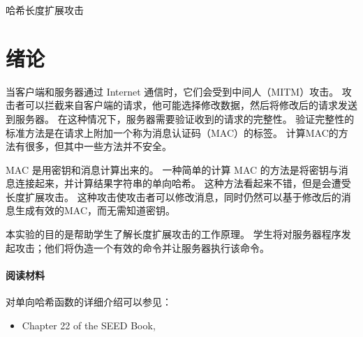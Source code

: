 
\newcommand{\commonfolder}{../../common-files}










\begin{center}
   {\LARGE 哈希长度扩展攻击}
\end{center}



\section{绪论}

当客户端和服务器通过 Internet 通信时，它们会受到中间人（MITM）攻击。
攻击者可以拦截来自客户端的请求，他可能选择修改数据，然后将修改后的请求发送到服务器。
在这种情况下，服务器需要验证收到的请求的完整性。
验证完整性的标准方法是在请求上附加一个称为消息认证码（MAC）的标签。
计算MAC的方法有很多，但其中一些方法并不安全。


MAC 是用密钥和消息计算出来的。
一种简单的计算 MAC 的方法是将密钥与消息连接起来，并计算结果字符串的单向哈希。
这种方法看起来不错，但是会遭受长度扩展攻击。
这种攻击使攻击者可以修改消息，同时仍然可以基于修改后的消息生成有效的MAC，而无需知道密钥。

本实验的目的是帮助学生了解长度扩展攻击的工作原理。
学生将对服务器程序发起攻击；他们将伪造一个有效的命令并让服务器执行该命令。


\paragraph{阅读材料}
对单向哈希函数的详细介绍可以参见：

\begin{itemize}
   \item Chapter 22 of the SEED Book, \seedbook
\end{itemize}


